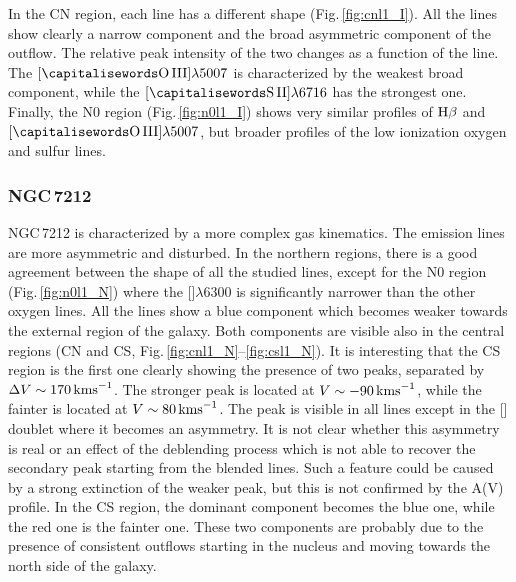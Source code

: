 \documentclass[../main.tex]{subfiles}
\begin{document}
In the CN region, each line has a different shape (Fig.\,\ref{fig:cnl1_I}).
All the lines show clearly a narrow component and the broad asymmetric component of the outflow.
The relative peak intensity of the two changes as a function of the line.
The $[\rm\ion{O}{III}]\lambda5007$ is characterized by the weakest broad component, while the $[\rm\ion{S}{II}]\lambda6716$ has the strongest one.
Finally, the N0 region (Fig.\,\ref{fig:n0l1_I}) shows very similar profiles of $\Hb$ and $[\rm\ion{O}{III}]\lambda5007$, but broader profiles of the low ionization oxygen and sulfur lines.


\subsubsection{NGC\,7212}

NGC\,7212 is characterized by a more complex gas kinematics.
The emission lines are more asymmetric and disturbed.
In the northern regions, there is a good agreement between the shape of all the studied lines, except for the N0 region (Fig.\,\ref{fig:n0l1_N}) where the []$\lambda6300$ is significantly narrower than the other oxygen lines.
All the lines show a blue component which becomes weaker towards the external region of the galaxy.
Both components are visible also in the central regions (CN and CS, Fig.\,\ref{fig:cnl1_N}--\ref{fig:csl1_N}).
It is interesting that the CS region is the first one clearly showing the presence of two peaks, separated by $\Delta V\sim 170\,\si{\kms}$.
The stronger peak is located at $V\sim -90\,\si{\kms}$, while the fainter is located at $V\sim80\,\si{\kms}$. 
The peak is visible in all lines except in the [] doublet where it becomes an asymmetry.
It is not clear whether this asymmetry is real or an effect of the deblending process which is not able to recover the secondary peak starting from the blended lines.
Such a feature could be caused by a strong extinction of the weaker peak, but this is not confirmed by the A(V) profile.
In the CS region, the dominant component becomes the blue one, while the red one is the fainter one.
These two components are probably due to the presence of consistent outflows starting in the nucleus and moving towards the north side of the galaxy. 
\end{document}
